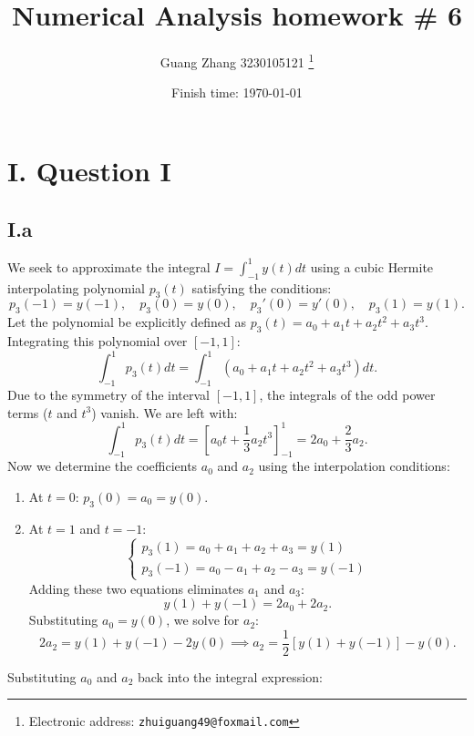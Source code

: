\documentclass[a4paper]{article}
\begin{document}
\title{Numerical Analysis homework \# 6}

\author{Guang Zhang 3230105121
  \thanks{Electronic address: \texttt{zhuiguang49@foxmail.com}}}

\date{Finish time: \today}

\maketitle


\section*{I. Question I}

\subsection*{I.a}
We seek to approximate the integral $I = \int_{-1}^{1} y(t) dt$ using a cubic Hermite interpolating polynomial $p_3(t)$ satisfying the conditions:
\[
p_3(-1) = y(-1), \quad p_3(0) = y(0), \quad p_3'(0) = y'(0), \quad p_3(1) = y(1).
\]
Let the polynomial be explicitly defined as $p_3(t) = a_0 + a_1 t + a_2 t^2 + a_3 t^3$.
Integrating this polynomial over $[-1, 1]$:
\[
\int_{-1}^{1} p_3(t) dt = \int_{-1}^{1} (a_0 + a_1 t + a_2 t^2 + a_3 t^3) dt.
\]
Due to the symmetry of the interval $[-1, 1]$, the integrals of the odd power terms ($t$ and $t^3$) vanish. We are left with:
\[
\int_{-1}^{1} p_3(t) dt = \left[ a_0 t + \frac{1}{3}a_2 t^3 \right]_{-1}^{1} = 2a_0 + \frac{2}{3}a_2.
\]
Now we determine the coefficients $a_0$ and $a_2$ using the interpolation conditions:
\begin{enumerate}
    \item At $t=0$: $p_3(0) = a_0 = y(0)$.
    \item At $t=1$ and $t=-1$:
    \[
    \begin{cases}
        p_3(1) = a_0 + a_1 + a_2 + a_3 = y(1) \\
        p_3(-1) = a_0 - a_1 + a_2 - a_3 = y(-1)
    \end{cases}
    \]
    Adding these two equations eliminates $a_1$ and $a_3$:
    \[
    y(1) + y(-1) = 2a_0 + 2a_2.
    \]
    Substituting $a_0 = y(0)$, we solve for $a_2$:
    \[
    2a_2 = y(1) + y(-1) - 2y(0) \implies a_2 = \frac{1}{2}[y(1) + y(-1)] - y(0).
    \]
\end{enumerate}
Substituting $a_0$ and $a_2$ back into the integral expression:
\end{document}
